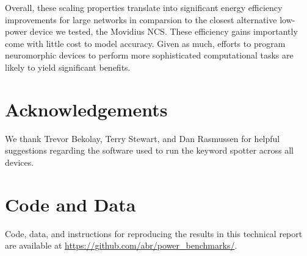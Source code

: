 \documentclass{article}
\begin{document}
Overall, these scaling properties translate into significant energy efficiency improvements for large networks in comparsion to the closest alternative low-power device we tested, the Movidius NCS. These efficiency gains importantly come with little cost to model accuracy. Given as much, efforts to program neuromorphic devices to perform more sophisticated computational tasks are likely to yield significant benefits. 

\section*{Acknowledgements}

We thank Trevor Bekolay, Terry Stewart, and Dan Rasmussen for helpful suggestions regarding the software used to run the keyword spotter across all devices.

\section*{Code and Data} 
 
Code, data, and instructions for reproducing the results in this technical report are available at \url{https://github.com/abr/power\_benchmarks/}.



\end{document}
